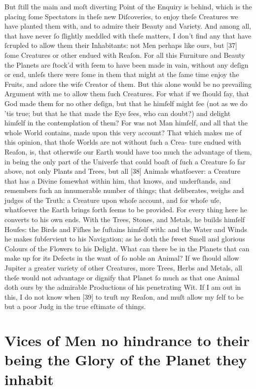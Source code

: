 \documentclass[letterpaper]{book}
\begin{document}
But ſtill the main and moſt diverting Point of the Enquiry is behind, which
is the placing ſome Spectators in theſe new Diſcoveries, to enjoy theſe
Creatures we have planted them with, and to admire their Beauty and
Variety.  And among all, that have never ſo ſlightly meddled with theſe
matters, I don't find any that have ſcrupled to allow them their
Inhabitants: not Men perhaps like ours, but [37] ſome Creatures or other
endued with Reaſon.  For all this Furniture and Beauty the Planets are
ſtock'd with ſeem to have been made in vain, without any deſign or end,
unleſs there were ſome in them that might at the ſame time enjoy the Fruits,
and adore the wiſe Creator of them. But this alone would be no prevailing
Argument with me to allow them ſuch Creatures. For what if we ſhould ſay,
that God made them for no other deſign, but that he himſelf might ſee (not
as we do 'tis true; but that he that made the Eye ſees, who can doubt?) and
delight himſelf in the contemplation of them? For was not Man himſelf, and
all that the whole World contains, made upon this very account? That which
makes me of this opinion, that thoſe Worlds are not without ſuch a Crea-
ture endued with Reaſon, is, that otherwiſe our Earth would have too much
the advantage of them, in being the only part of the Univerſe that could
boaſt of ſuch a Creature ſo far above, not only Plants and Trees, but all
[38] Animals whatſoever: a Creature that has a Divine ſomewhat within him,
that knows, and underſtands, and remembers ſuch an innumerable number of
things; that deliberates, weighs and judges of the Truth: a Creature upon
whoſe account, and for whoſe uſe, whatſoever the Earth brings forth ſeems to
be provided. For every thing here he converts to his own ends. With the
Trees, Stones, and Metals, he builds himſelf Houſes: the Birds and Fiſhes he
ſuſtains himſelf with: and the Water and Winds he makes ſubſervient to his
Navigation; as he doth the ſweet Smell and glorious Colours of the Flowers
to his Delight. What can there be in the Planets that can make up for its
Defects in the want of ſo noble an Animal? If we ſhould allow Jupiter a
greater variety of other Creatures, more Trees, Herbs and Metals, all theſe
would not advantage or dignify that Planet ſo much as that one Animal doth
ours by the admirable Productions of his penetrating Wit. If I am out in
this, I do not know when [39] to truſt my Reaſon, and muſt allow my ſelf to
be but a poor Judg in the true eſtimate of things.


\section{Vices of Men no hindrance to their being the Glory of the Planet
they inhabit}
\end{document}
